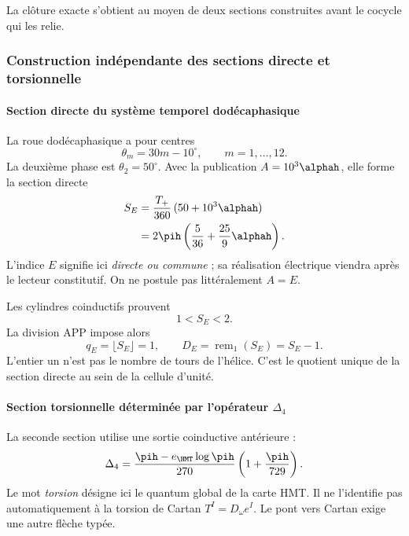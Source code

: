 \noindent La clôture exacte s'obtient au moyen de deux sections construites avant le cocycle qui les relie.\par\medskip

\subsubsection{Construction indépendante des sections directe et torsionnelle}

\paragraph{Section directe du système temporel dodécaphasique}

La roue dodécaphasique a pour centres
\begin{equation}
\theta_m=30m-10^\circ,\qquad m=1,\ldots,12.
\label{eq:rueda-dodecafasica}
\end{equation}
La deuxième phase est \(\theta_2=50^\circ\). Avec la publication
\(A=10^3\alphah\), elle forme la section directe
\begin{align}
S_E
&=\frac{T_+}{360}\,(50+10^3\alphah)\\
&=2\pih\left(\frac5{36}+\frac{25}{9}\alphah\right).
\label{eq:seccion-electrica}
\end{align}
L'indice \(E\) signifie ici \emph{directe ou commune} ; sa réalisation
électrique viendra après le lecteur constitutif. On ne postule pas
littéralement \(A=E\).

Les cylindres coinductifs prouvent
\begin{equation}
1<S_E<2.
\label{eq:SE-intervalo}
\end{equation}
La division APP impose alors
\begin{equation}
q_E=\lfloor S_E\rfloor=1,
\qquad
D_E=\operatorname{rem}_1(S_E)=S_E-1.
\label{eq:DE}
\end{equation}
L'entier un n'est pas le nombre de tours de l'hélice. C'est le quotient unique
de la section directe au sein de la cellule d'unité.

\paragraph{Section torsionnelle déterminée par l'opérateur \(\Delta_4\)}

La seconde section utilise une sortie coinductive antérieure :
\begin{equation}
\Delta_4=
\frac{\pih-e_{\HMT}\log\pih}{270}
\left(1+\frac{\pih}{729}\right).
\label{eq:delta4}
\end{equation}
Le mot \emph{torsion} désigne ici le quantum global de la carte HMT. Il ne
l'identifie pas automatiquement à la torsion de Cartan
\(T^I=D_\omega e^I\). Le pont vers Cartan exige une autre flèche typée.
